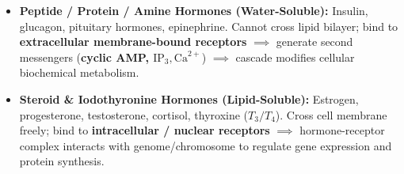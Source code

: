 \documentclass[10pt,a4paper]{article}
\begin{document}
\begin{ncertbox}
\begin{itemize}
  \item \textbf{Peptide / Protein / Amine Hormones (Water-Soluble):} Insulin, glucagon, pituitary hormones, epinephrine. Cannot cross lipid bilayer; bind to \textbf{extracellular membrane-bound receptors} $\implies$ generate second messengers (\textbf{cyclic AMP, $\mathrm{IP}_3, \mathrm{Ca}^{2+}$}) $\implies$ cascade modifies cellular biochemical metabolism.
  \item \textbf{Steroid \& Iodothyronine Hormones (Lipid-Soluble):} Estrogen, progesterone, testosterone, cortisol, thyroxine ($T_3/T_4$). Cross cell membrane freely; bind to \textbf{intracellular / nuclear receptors} $\implies$ hormone-receptor complex interacts with genome/chromosome to regulate gene expression and protein synthesis.
\end{itemize}
\end{ncertbox}
\end{document}
